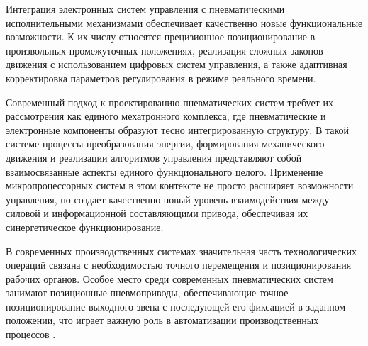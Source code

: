 Интеграция электронных систем управления с пневматическими исполнительными
механизмами обеспечивает качественно новые функциональные возможности. К их числу
относятся прецизионное позиционирование в произвольных промежуточных положениях,
реализация сложных законов движения с использованием цифровых систем управления, а
также адаптивная корректировка параметров регулирования в режиме реального времени\cite{salim2011control,situm2013control}.

Современный подход к проектированию пневматических систем требует их рассмотрения как единого
мехатронного комплекса, где пневматические и электронные компоненты образуют тесно интегрированную
структуру. В такой системе процессы преобразования энергии, формирования
механического движения и реализации алгоритмов управления представляют собой взаимосвязанные
аспекты единого функционального целого. Применение микропроцессорных систем в этом
контексте не просто расширяет возможности управления, но создает качественно новый уровень
взаимодействия между силовой и информационной составляющими привода, обеспечивая их
синергетическое функционирование\cite{safuan2010microcontroller, vladur2016dynamic, lababidi2023position}.

В современных производственных системах значительная часть технологических операций связана с необходимостью точного
перемещения и позиционирования рабочих органов. Особое место среди современных пневматических систем занимают позиционные
пневмоприводы, обеспечивающие точное позиционирование выходного звена с последующей его фиксацией в
заданном положении, что играет важную роль в автоматизации производственных процессов \cite{papoutsidakis2007control,qiu2024position}.
